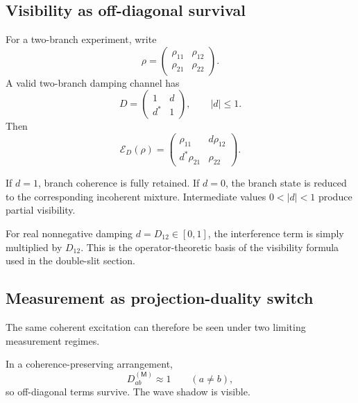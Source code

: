 \documentclass[11pt]{article}
\newcommand{\Meas}{\mathsf M}
\begin{document}
\subsection{Visibility as off-diagonal survival}
\label{subsec:visibility-offdiagonal-survival}

For a two-branch experiment, write
\begin{equation}
  \rho
  =
  \begin{pmatrix}
  \rho_{11} & \rho_{12}\\
  \rho_{21} & \rho_{22}
  \end{pmatrix}.
\end{equation}
A valid two-branch damping channel has
\begin{equation}
  D=
  \begin{pmatrix}
  1 & d\\
  d^\ast & 1
  \end{pmatrix},
  \qquad
  |d|\le1.
\end{equation}
Then
\begin{equation}
  \mathcal E_D(\rho)
  =
  \begin{pmatrix}
  \rho_{11} & d\rho_{12}\\
  d^\ast\rho_{21} & \rho_{22}
  \end{pmatrix}.
\end{equation}

If \(d=1\), branch coherence is fully retained. If \(d=0\), the branch state is reduced to the
corresponding incoherent mixture. Intermediate values \(0<|d|<1\) produce partial visibility.

For real nonnegative damping \(d=D_{12}\in[0,1]\), the interference term is simply multiplied
by \(D_{12}\). This is the operator-theoretic basis of the visibility formula used in the
double-slit section.

\subsection{Measurement as projection-duality switch}
\label{subsec:measurement-projection-duality-switch}

The same coherent excitation can therefore be seen under two limiting measurement regimes.

In a coherence-preserving arrangement,
\begin{equation}
  D_{ab}^{(\Meas)}\approx1
  \qquad
  (a\neq b),
\end{equation}
so off-diagonal terms survive. The wave shadow is visible.
\end{document}
